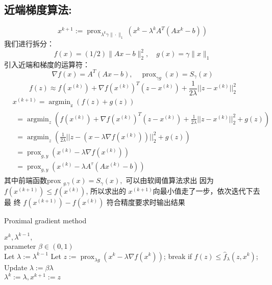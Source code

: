 \documentclass[cn,11pt,chinese,black]{elegantbook}
\begin{document}
\subsection{近端梯度算法:} 
$$x^{k+1}:=\operatorname{prox}_{\lambda^{k} \gamma\|\cdot\|_{1}}\left(x^{k}-\lambda^{k} A^{T}\left(A x^{k}-b\right)\right)$$
我们进行拆分：
$$f(x)=(1 / 2)\|A x-b\|_{2}^{2}, \quad g(x)=\gamma\|x\|_{1}$$
引入近端和梯度的运算符：
$$\nabla f(x)=A^{T}(A x-b), \quad \operatorname{prox}_{\gamma g}(x)=S_{\gamma}(x)$$
$$f(z) \approx f\left(x^{(k)}\right)+\nabla f\left(x^{(k)}\right)^{T}\left(z-x^{(k)}\right)+\frac{1}{2 \lambda}|| z-x^{(k)}||_{2}^{2}$$
$$\begin{aligned}
&x^{(k+1)}=\operatorname{argmin}_{\mathrm{z}}(f(z)+g(z))\\
&\begin{array}{l}
=\operatorname{argmin}_{z}\left(f\left(x^{(k)}\right)+\nabla f\left(x^{(k)}\right)^{T}\left(z-x^{(k)}\right)+\frac{1}{2 \lambda}|| z-x^{(k)}||_{2}^{2}+g(z)\right) \\
=\operatorname{argmin}_{z}\left(\frac{1}{2 \lambda}|| z-\left(x-\lambda \nabla f\left(x^{(k)}\right)\right)||_{2}^{2}+g(z)\right) \\
=\operatorname{prox}_{g, y}\left(x^{(k)}-\lambda \nabla f\left(x^{(k)}\right)\right) \\
=\operatorname{prox}_{g, y}\left(x^{(k)}-\lambda A^{\tau}\left(A x^{(k)}-b\right)\right)
\end{array}
\end{aligned}$$
其中前端函数prox $_{g . \gamma}(x)=S_{\gamma}(x),$ 可以由软阈值算法求出
因为 $f\left(x^{(k+1)}\right) \leq f\left(x^{(k)}\right)$, 所以求出的 $x^{(k+1)}$向最小值走了一步，依次迭代下去最
终 $f\left(x^{(k+1)}\right)-f\left(x^{(k)}\right)$ 符合精度要求时输出结果
\begin{algorithm}[h]
	\caption{Proximal gradient method}
	\label{alg::conjugateGradient}
	\begin{algorithmic}[1]
		\Require
		$x^{k}, \lambda^{k-1},$\\
		parameter $\beta \in(0,1)$ \\
		Let $\lambda:=\lambda^{k-1}$
		\Repeat
		\State  Let $z:=\operatorname{prox}_{\lambda g}\left(x^{k}-\lambda \nabla f\left(x^{k}\right)\right)$;
		\State  break if $f(z) \leq \hat{f}_{\lambda}\left(z, x^{k}\right)$;
		\State Update $\lambda:=\beta \lambda$ \\
		\Return  $\lambda^{k}:=\lambda, x^{k+1}:=z$
	\end{algorithmic}
\end{algorithm} 
\end{document}
